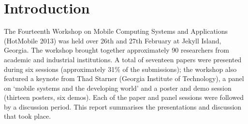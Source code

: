 \section{Introduction}
\label{sec:introduction}

The Fourteenth Workshop on Mobile Computing Systems and Applications (HotMobile 
2013) was held over 26th and 27th February at Jekyll Island, Georgia. The workshop 
brought together approximately 90 researchers from academic and industrial 
institutions. A total of seventeen papers were presented during six
sessions (approximately 31\% of the submissions); the workshop
also featured a keynote from  Thad Starner (Georgia Institute of
Technology), a panel on `mobile systems and the developing world' and a
poster and demo session (thirteen posters, six demos). Each of the paper and
panel sessions were followed by a discussion period. This report
summarises the
presentations and discussion that took place.
